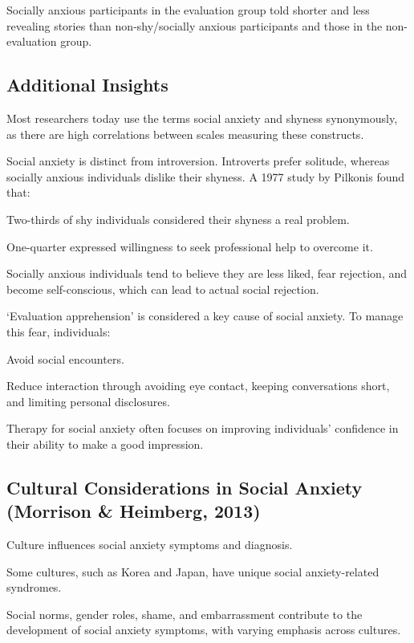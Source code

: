\begin{coloredlist}  
    \item Socially anxious participants in the evaluation group told shorter and less revealing stories than non-shy/socially anxious participants and those in the non-evaluation group.  
\end{coloredlist}  

\subsection{Additional Insights}  
\begin{coloredlist}  
    \item Most researchers today use the terms social anxiety and shyness synonymously, as there are high correlations between scales measuring these constructs.  
    \item Social anxiety is distinct from introversion. Introverts prefer solitude, whereas socially anxious individuals dislike their shyness. A 1977 study by Pilkonis found that:  
    \begin{coloredlist}  
        \item Two-thirds of shy individuals considered their shyness a real problem.  
        \item One-quarter expressed willingness to seek professional help to overcome it.  
    \end{coloredlist}  
    \item Socially anxious individuals tend to believe they are less liked, fear rejection, and become self-conscious, which can lead to actual social rejection.  
    \item ‘Evaluation apprehension’ is considered a key cause of social anxiety. To manage this fear, individuals:  
    \begin{coloredlist}  
        \item Avoid social encounters.  
        \item Reduce interaction through avoiding eye contact, keeping conversations short, and limiting personal disclosures.  
    \end{coloredlist}  
    \item Therapy for social anxiety often focuses on improving individuals' confidence in their ability to make a good impression.  
\end{coloredlist}  

\subsection{Cultural Considerations in Social Anxiety (Morrison \& Heimberg, 2013)}  
\begin{coloredlist}  
    \item Culture influences social anxiety symptoms and diagnosis.  
    \item Some cultures, such as Korea and Japan, have unique social anxiety-related syndromes.  
    \item Social norms, gender roles, shame, and embarrassment contribute to the development of social anxiety symptoms, with varying emphasis across cultures.  
\end{coloredlist}  

